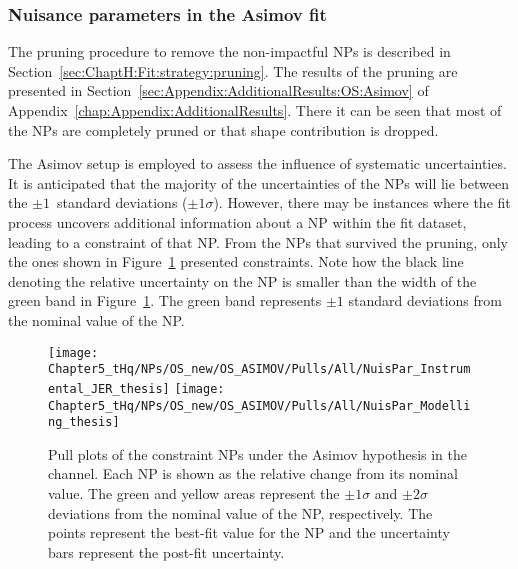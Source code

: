 \subsubsection{Nuisance parameters in the \dilepOStau Asimov fit}
\label{sec:ChaptH:Fit:ASIMOV:OS:NPs}

The pruning procedure to remove the non-impactful NPs is described in Section~\ref{sec:ChaptH:Fit:strategy:pruning}.
The results of the pruning are presented in Section~\ref{sec:Appendix:AdditionalResults:OS:Asimov} of
Appendix~\ref{chap:Appendix:AdditionalResults}. There it can be seen that most of the NPs are completely
pruned or that shape contribution is dropped.

The Asimov setup is employed to assess the influence of systematic uncertainties.
It is anticipated that the majority of the uncertainties of the NPs will lie between the 
$\pm 1$~standard deviations ($\pm 1\sigma$).
However, there may be instances where the fit process uncovers additional information 
about a NP within the fit dataset, leading to a constraint of that NP.  %
From the NPs that survived the pruning, only the ones shown in 
Figure~\ref{fig:ChaptH:Asimov:OS:ConstrainedNPs} presented constraints. 
Note how the black line denoting the relative uncertainty on the NP is smaller than the width of the green band in Figure~\ref{fig:ChaptH:Asimov:OS:ConstrainedNPs}.
The green band represents $\pm 1$ standard deviations from 
the nominal value of the NP. 



\begin{figure}[h] 
  \texttt{[image: Chapter5\_tHq/NPs/OS\_new/OS\_ASIMOV/Pulls/All/NuisPar\_Instrumental\_JER\_thesis]}
  \texttt{[image: Chapter5\_tHq/NPs/OS\_new/OS\_ASIMOV/Pulls/All/NuisPar\_Modelling\_thesis]}
\caption{Pull plots of the constraint NPs under the Asimov hypothesis in the \dilepOStau channel.
Each NP is shown as the relative change from its nominal value.
   The green and yellow areas represent the $\pm1\sigma$ and $\pm2\sigma$ deviations from the nominal value of the NP, respectively. 
   The points represent the best-fit value for the NP and the uncertainty bars represent the post-fit uncertainty.} 
\label{fig:ChaptH:Asimov:OS:ConstrainedNPs}
\end{figure}


